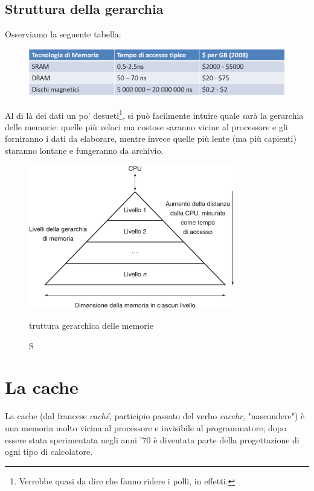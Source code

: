 \documentclass[class=book, crop=false, oneside]{standalone}
\begin{document}
\subsection{Struttura della gerarchia}
Osserviamo la seguente tabella:
\begin{figure}[H]
  \centering
  \includegraphics[width=\textwidth,keepaspectratio]{tabella_polli.png}
\end{figure}
Al di là dei dati un po' desueti\footnote{Verrebbe quasi da dire che fanno ridere i polli, in effetti.}, si può facilmente intuire quale sarà la gerarchia delle memorie: quelle più veloci ma costose saranno vicine al processore e gli forniranno i dati da elaborare, mentre invece quelle più lente (ma più capienti) staranno lontane e fungeranno da archivio.
\begin{figure}[H]
  \centering
  \includegraphics[width=0.8\textwidth,keepaspectratio]{strut-ger.png}
  \caption Struttura gerarchica delle memorie
\end{figure}

\section{La cache}
La cache (dal francese \emph{caché}, participio passato del verbo \emph{cacehr}, "nascondere") è una memoria molto vicina al processore e invisibile al programmatore; dopo essere stata sperimentata negli anni '70 è diventata parte della progettazione di ogni tipo di calcolatore.
\end{document}
